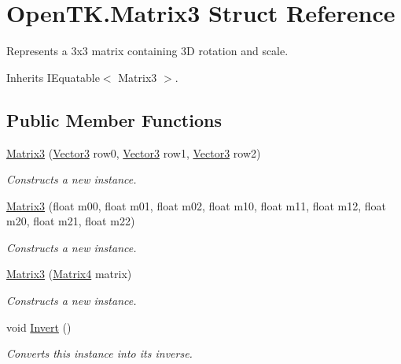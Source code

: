 \hypertarget{struct_open_t_k_1_1_matrix3}{\section{Open\-T\-K.\-Matrix3 Struct Reference}
\label{struct_open_t_k_1_1_matrix3}
}


Represents a 3x3 matrix containing 3\-D rotation and scale.  




Inherits I\-Equatable$<$ Matrix3 $>$.

\subsection*{Public Member Functions}
\begin{DoxyCompactItemize}
\item 
\hyperlink{struct_open_t_k_1_1_matrix3_a445803ab277cd642c1e4e3a4371607b0}{Matrix3} (\hyperlink{struct_open_t_k_1_1_vector3}{Vector3} row0, \hyperlink{struct_open_t_k_1_1_vector3}{Vector3} row1, \hyperlink{struct_open_t_k_1_1_vector3}{Vector3} row2)
\begin{DoxyCompactList}\small\item\em Constructs a new instance. \end{DoxyCompactList}\item 
\hyperlink{struct_open_t_k_1_1_matrix3_a440ac6237b7ef235cef5b7c19271cc70}{Matrix3} (float m00, float m01, float m02, float m10, float m11, float m12, float m20, float m21, float m22)
\begin{DoxyCompactList}\small\item\em Constructs a new instance. \end{DoxyCompactList}\item 
\hyperlink{struct_open_t_k_1_1_matrix3_a414c7926b1afb9dc8874bb2af097443f}{Matrix3} (\hyperlink{struct_open_t_k_1_1_matrix4}{Matrix4} matrix)
\begin{DoxyCompactList}\small\item\em Constructs a new instance. \end{DoxyCompactList}\item 
void \hyperlink{struct_open_t_k_1_1_matrix3_a26d13a9a3523148f1bcede2ef4a91471}{Invert} ()
\begin{DoxyCompactList}\small\item\em Converts this instance into its inverse. \end{DoxyCompactList}\item 

\end{DoxyCompactItemize}
